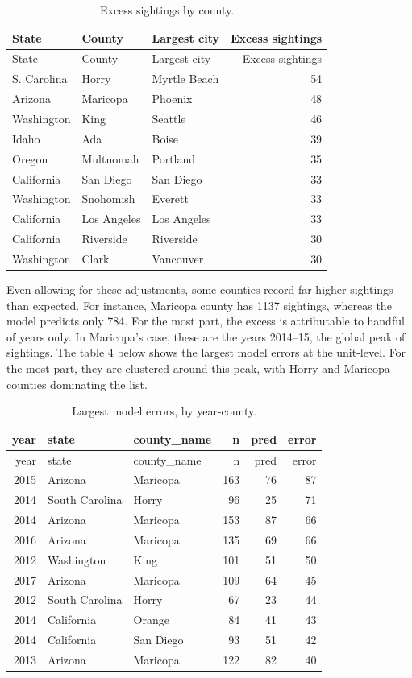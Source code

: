 \documentclass[]{elsarticle} %
\begin{document}
\begin{longtable}[]{@{}lllr@{}}
\caption{Excess sightings by county.}\tabularnewline
\toprule
State & County & Largest city & Excess sightings \\
\midrule
\endfirsthead
\toprule
State & County & Largest city & Excess sightings \\
\midrule
\endhead
S. Carolina & Horry & Myrtle Beach & 54 \\
Arizona & Maricopa & Phoenix & 48 \\
Washington & King & Seattle & 46 \\
Idaho & Ada & Boise & 39 \\
Oregon & Multnomah & Portland & 35 \\
California & San Diego & San Diego & 33 \\
Washington & Snohomish & Everett & 33 \\
California & Los Angeles & Los Angeles & 33 \\
California & Riverside & Riverside & 30 \\
Washington & Clark & Vancouver & 30 \\
\bottomrule
\end{longtable}

Even allowing for these adjustments, some counties record far higher
sightings than expected. For instance, Maricopa county has 1137
sightings, whereas the model predicts only 784. For the most part, the
excess is attributable to handful of years only. In Maricopa's case,
these are the years 2014--15, the global peak of sightings. The table 4
below shows the largest model errors at the unit-level. For the most
part, they are clustered around this peak, with Horry and Maricopa
counties dominating the list.

\pagebreak

\begin{longtable}[]{@{}rllrrr@{}}
\caption{Largest model errors, by year-county.}\tabularnewline
\toprule
year & state & county\_name & n & pred & error \\
\midrule
\endfirsthead
\toprule
year & state & county\_name & n & pred & error \\
\midrule
\endhead
2015 & Arizona & Maricopa & 163 & 76 & 87 \\
2014 & South Carolina & Horry & 96 & 25 & 71 \\
2014 & Arizona & Maricopa & 153 & 87 & 66 \\
2016 & Arizona & Maricopa & 135 & 69 & 66 \\
2012 & Washington & King & 101 & 51 & 50 \\
2017 & Arizona & Maricopa & 109 & 64 & 45 \\
2012 & South Carolina & Horry & 67 & 23 & 44 \\
2014 & California & Orange & 84 & 41 & 43 \\
2014 & California & San Diego & 93 & 51 & 42 \\
2013 & Arizona & Maricopa & 122 & 82 & 40 \\
\bottomrule
\end{longtable}
\end{document}
